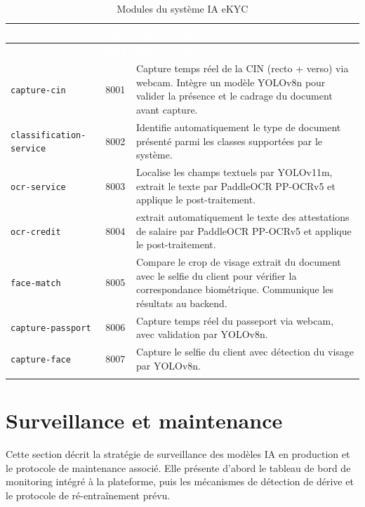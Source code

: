 \renewcommand{\arraystretch}{1.3}
\begin{longtable}{|l|c|p{8cm}|}
  \rowcolor{bleu_principal}
  \textcolor{white}{\textbf{Service}} & \textcolor{white}{\textbf{Port}} & \textcolor{white}{\textbf{Description}} \\
  \hline
  \endfirsthead
  \rowcolor{bleu_principal}
  \textcolor{white}{\textbf{Service}} & \textcolor{white}{\textbf{Port}} & \textcolor{white}{\textbf{Description}} \\
  \hline
  \endhead
  \texttt{capture-cin} & 8001 & Capture temps réel de la CIN (recto + verso) via webcam. Intègre un modèle YOLOv8n pour valider la présence et le cadrage du document avant capture. \\
  \hline
  \texttt{classification-service} & 8002 & Identifie automatiquement le type de document présenté parmi les classes supportées par le système. \\
  \hline
  \texttt{ocr-service} & 8003 & Localise les champs textuels par YOLOv11m, extrait le texte par PaddleOCR PP-OCRv5 et applique le post-traitement. \\
  \hline
   \hline
  \texttt{ocr-credit} & 8004 & extrait automatiquement le texte des attestations de salaire par PaddleOCR PP-OCRv5 et applique le post-traitement. \\
  \hline
  \texttt{face-match} & 8005 & Compare le crop de visage extrait du document avec le selfie du client pour vérifier la correspondance biométrique. Communique les résultats au backend. \\
  \hline
  \texttt{capture-passport} & 8006 & Capture temps réel du passeport via webcam, avec validation par YOLOv8n. \\
  \hline
  \texttt{capture-face} & 8007 & Capture le selfie du client avec détection du visage par YOLOv8n. \\
  

  \caption{Modules du système IA eKYC}
  \label{tab:services-ia}
\end{longtable}


\section{Surveillance et maintenance}
\label{sec:surveillance-maintenance}

Cette section décrit la stratégie de surveillance des modèles IA en production et le protocole de maintenance associé. Elle présente d'abord le tableau de bord de monitoring intégré à la plateforme, puis les mécanismes de détection de dérive et le protocole de ré-entraînement prévu.

